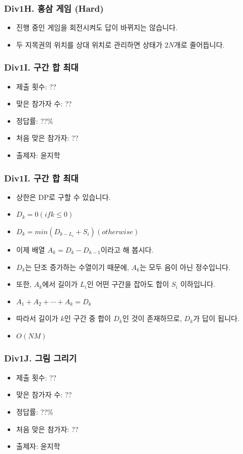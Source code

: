 \documentclass[xetex]{beamer}
\begin{document}
\begin{frame}
  \frametitle{Div1H. 홍삼 게임 (Hard)}
  \begin{itemize}
    \item 진행 중인 게임을 회전시켜도 답이 바뀌지는 않습니다.
    \item 두 지목권의 위치를 상대 위치로 관리하면 상태가 $2N$개로 줄어듭니다.
  \end{itemize}
\end{frame}

\begin{frame}
  \frametitle{Div1I. 구간 합 최대}
  \begin{itemize}
    \item 제출 횟수: ??
    \item 맞은 참가자 수: ??
    \item 정답률: ??\%
    \item 처음 맞은 참가자: ??
    \item 출제자: 윤지학
  \end{itemize}
\end{frame}

\begin{frame}
  \frametitle{Div1I. 구간 합 최대}
  \begin{itemize}
    \item 상한은 DP로 구할 수 있습니다.
    \item $D_k = 0 (if k \le 0)$
    \item $D_k = min ( D_{k - L_i} + S_i ) (otherwise)$
    \item 이제 배열 $A_k = D_k - D_{k - 1}$이라고 해 봅시다.
    \item $D_k$는 단조 증가하는 수열이기 때문에, $A_k$는 모두 음이 아닌 정수입니다.
    \item 또한, $A_k$에서 길이가 $L_i$인 어떤 구간을 잡아도 합이 $S_i$ 이하입니다.
    \item $A_1 + A_2 + \cdots + A_k = D_k$
    \item 따라서 길이가 $k$인 구간 중 합이 $D_k$인 것이 존재하므로, $D_k$가 답이 됩니다.
    \item $O(NM)$
  \end{itemize}
\end{frame}

\begin{frame}
  \frametitle{Div1J. 그림 그리기}
  \begin{itemize}
    \item 제출 횟수: ??
    \item 맞은 참가자 수: ??
    \item 정답률: ??\%
    \item 처음 맞은 참가자: ??
    \item 출제자: 윤지학
  \end{itemize}
\end{frame}
\end{document}
